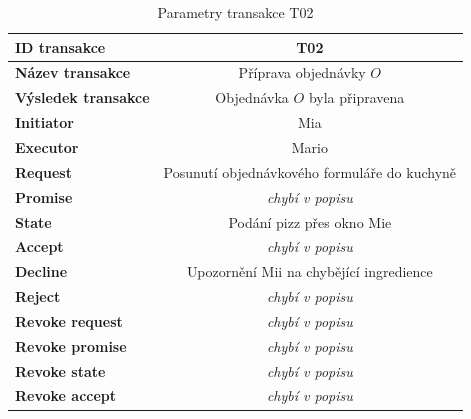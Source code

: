 \begin{table} [H] \centering
\begin{tabular}{|>{\bfseries} l| | c |}
\hline
  ID transakce & T02 \\
\hline
  Název transakce & Příprava objednávky $O$  \\
\hline
  Výsledek transakce & Objednávka $O$ byla připravena \\
\hline
  Initiator & Mia \\
\hline
  Executor & Mario \\
\hline
\hline
  Request & Posunutí objednávkového formuláře do kuchyně \\
\hline
  Promise &  \textit{chybí v popisu} \\
\hline
  State & Podání pizz přes okno Mie \\
\hline
  Accept & \textit{chybí v popisu} \\
\hline
\hline
  Decline &  Upozornění Mii na chybějící ingredience \\
\hline
  Reject & \textit{chybí v popisu} \\
\hline
\hline
  Revoke request & \textit{chybí v popisu} \\
\hline
  Revoke promise & \textit{chybí v popisu} \\
\hline
  Revoke state & \textit{chybí v popisu} \\
\hline
  Revoke accept & \textit{chybí v popisu} \\
\hline
\end{tabular}
\caption{Parametry transakce T02}
\label{tab:t02_param}
\end{table}

